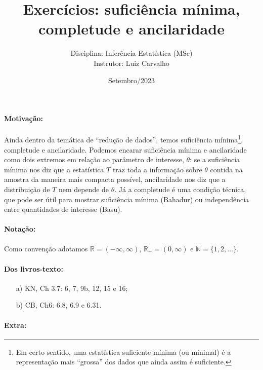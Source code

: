 \documentclass[a4paper,10pt, notitlepage]{report}
\title{Exercícios: suficiência mínima, completude e ancilaridade}
\author{Disciplina: Inferência Estatística (MSc) \\ Instrutor: Luiz Carvalho}
\date{Setembro/2023}
\newcommand{\rpl}{\mathbb{R}_+}
\begin{document}
\maketitle

\paragraph{Motivação:} Ainda dentro da temática de ``redução de dados'', temos suficiência mínima\footnote{Em certo sentido, uma estatística suficiente mínima (ou minimal) é a representação mais ``grossa'' dos dados que ainda assim é suficiente.}, completude e ancilaridade.
Podemos encarar suficiência mínima e ancilaridade como dois extremos em relação ao parâmetro de interesse, $\theta$: se a suficiência mínima nos diz que a estatística $T$ traz toda a informação sobre $\theta$ contida na amostra  da maneira mais compacta possível, ancilaridade nos diz que a distribuição de $T$ nem depende de $\theta$. 
Já a completude é uma condição técnica, que pode ser útil para mostrar suficiência mínima (Bahadur) ou independência entre quantidades de interesse (Basu).

\paragraph{Notação:} Como convenção adotamos $\mathbb{R} = (-\infty, \infty)$, $\rpl = (0, \infty)$ e $\mathbb{N} = \{1, 2, \ldots \}$.

\paragraph{Dos livros-texto:}

\begin{itemize}
    \item[a)] KN, Ch 3.7: 6, 7, 9b, 12, 15 e 16;
    \item[b)] CB, Ch6: 6.8, 6.9 e 6.31.
\end{itemize}

\paragraph{Extra:}
\end{document}
